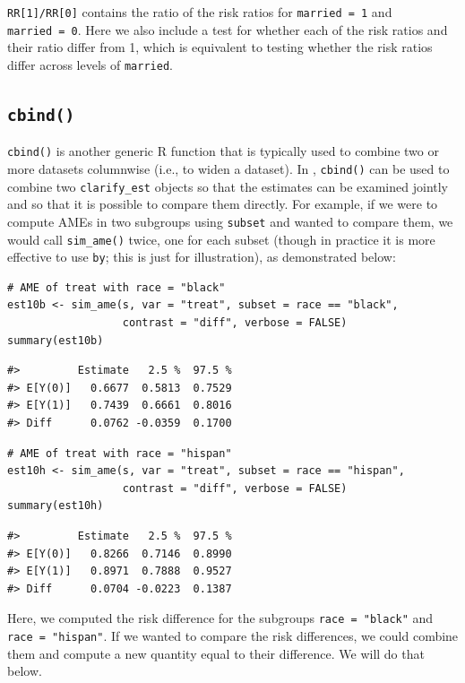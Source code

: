 \texttt{RR{[}1{]}/RR{[}0{]}} contains the ratio of the risk ratios for \texttt{married\ =\ 1} and \texttt{married\ =\ 0}. Here we also include a test for whether each of the risk ratios and their ratio differ from 1, which is equivalent to testing whether the risk ratios differ across levels of \texttt{married}.

\subsection{\texorpdfstring{\texttt{cbind()}}{cbind()}}\label{cbind}

\texttt{cbind()} is another generic R function that is typically used to combine two or more datasets columnwise (i.e., to widen a dataset). In , \texttt{cbind()} can be used to combine two \texttt{clarify\_est} objects so that the estimates can be examined jointly and so that it is possible to compare them directly. For example, if we were to compute AMEs in two subgroups using \texttt{subset} and wanted to compare them, we would call \texttt{sim\_ame()} twice, one for each subset (though in practice it is more effective to use \texttt{by}; this is just for illustration), as demonstrated below:

\begin{verbatim}
# AME of treat with race = "black"
est10b <- sim_ame(s, var = "treat", subset = race == "black",
                  contrast = "diff", verbose = FALSE)
summary(est10b)
\end{verbatim}

\begin{verbatim}
#>         Estimate   2.5 %  97.5 %
#> E[Y(0)]   0.6677  0.5813  0.7529
#> E[Y(1)]   0.7439  0.6661  0.8016
#> Diff      0.0762 -0.0359  0.1700
\end{verbatim}

\begin{verbatim}
# AME of treat with race = "hispan"
est10h <- sim_ame(s, var = "treat", subset = race == "hispan",
                  contrast = "diff", verbose = FALSE)
summary(est10h)
\end{verbatim}

\begin{verbatim}
#>         Estimate   2.5 %  97.5 %
#> E[Y(0)]   0.8266  0.7146  0.8990
#> E[Y(1)]   0.8971  0.7888  0.9527
#> Diff      0.0704 -0.0223  0.1387
\end{verbatim}

Here, we computed the risk difference for the subgroups \texttt{race\ =\ "black"} and \texttt{race\ =\ "hispan"}. If we wanted to compare the risk differences, we could combine them and compute a new quantity equal to their difference. We will do that below.

